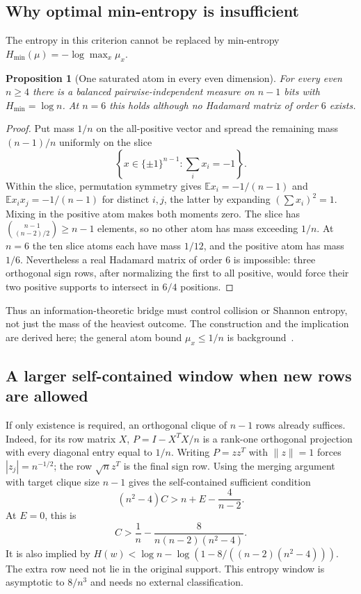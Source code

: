 \documentclass[11pt]{article}
\newtheorem{proposition}[theorem]{Proposition}
\begin{document}
\subsection{Why optimal min-entropy is insufficient}
The entropy in this criterion cannot be replaced by min-entropy
$H_{\min}(\mu)=-\log\max_x\mu_x$.
\begin{proposition}[One saturated atom in every even dimension]
\label{prop:minentropy-counter}
For every even $n\ge4$ there is a balanced pairwise-independent measure
on $n-1$ bits with $H_{\min}=\log n$. At $n=6$ this holds although
no Hadamard matrix of order $6$ exists.
\end{proposition}
\begin{proof}
Put mass $1/n$ on the all-positive vector and spread the remaining
mass $(n-1)/n$ uniformly on the slice
\[
 \left\{x\in\{\pm1\}^{n-1}:\sum_i x_i=-1\right\}.
\]
Within the slice, permutation symmetry gives
$\mathbb E x_i=-1/(n-1)$ and
$\mathbb E x_ix_j=-1/(n-1)$ for distinct $i,j$, the latter by
expanding $(\sum x_i)^2=1$. Mixing in the positive atom makes both
moments zero. The slice has $\binom{n-1}{(n-2)/2}\ge n-1$ elements,
so no other atom has mass exceeding $1/n$.
At $n=6$ the ten slice atoms each have mass $1/12$, and the positive
atom has mass $1/6$. Nevertheless a real Hadamard matrix of order
$6$ is impossible: three orthogonal sign rows, after normalizing
the first to all positive, would force their two positive supports
to intersect in $6/4$ positions.
\end{proof}
Thus an information-theoretic bridge must control collision or Shannon
entropy, not just the mass of the heaviest outcome. The construction
and the implication are derived here; the general atom bound
$\mu_x\le1/n$ is background~\cite{GP}.

\subsection{A larger self-contained window when new rows are allowed}
If only existence is required, an orthogonal clique of $n-1$ rows
already suffices. Indeed, for its row matrix $X$,
$P=I-X^TX/n$ is a rank-one orthogonal projection with every diagonal
entry equal to $1/n$. Writing $P=zz^T$ with $\|z\|=1$ forces
$|z_j|=n^{-1/2}$; the row $\sqrt n z^T$ is the final sign row.
Using the merging argument with target clique size $n-1$ gives the
self-contained sufficient condition
\[
 (n^2-4)C>n+E-\frac4{n-2}.
\]
At $E=0$, this is
\[
 C>\frac1n-\frac8{n(n-2)(n^2-4)}.
\]
It is also implied by
$H(w)<\log n-\log(1-8/((n-2)(n^2-4)))$.
The extra row need not lie in the original support. This entropy
window is asymptotic to $8/n^3$ and needs no external classification.
\end{document}
